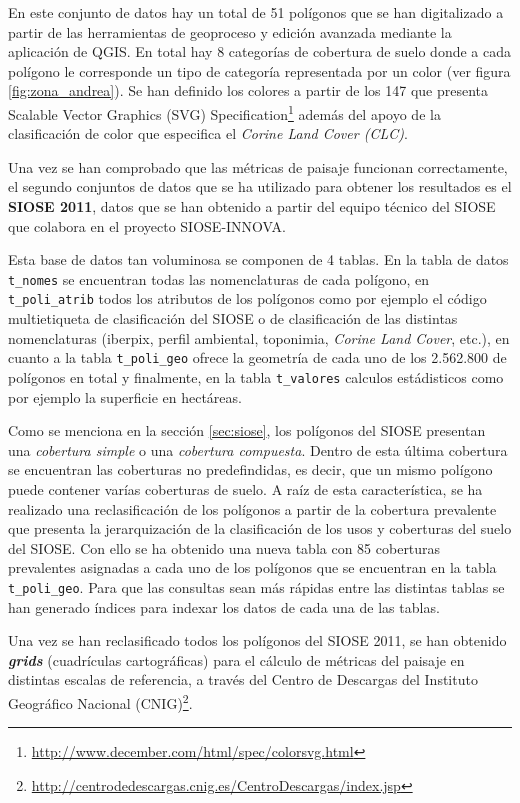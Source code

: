 En este conjunto de datos hay un total de 51 polígonos que se han digitalizado a partir de las herramientas de geoproceso y edición avanzada mediante la aplicación de QGIS. En total hay 8 categorías de cobertura de suelo donde a cada polígono le corresponde un tipo de categoría representada por un color (ver figura \ref{fig:zona_andrea}). Se han definido los colores a partir de los 147 que presenta Scalable Vector Graphics (SVG) Specification\footnote{\url{http://www.december.com/html/spec/colorsvg.html}} además del apoyo de la clasificación de color que especifica el \textit{Corine Land Cover (CLC)}.

Una vez se han comprobado que las métricas de paisaje funcionan correctamente, el segundo conjuntos de datos que se ha utilizado para obtener los resultados es el \textbf{SIOSE 2011}, datos que se han obtenido a partir del equipo técnico del SIOSE que colabora en el proyecto SIOSE-INNOVA. 

Esta base de datos tan voluminosa se componen de 4 tablas. En la tabla de datos \texttt{t\_nomes} se encuentran todas las nomenclaturas de cada polígono, en \texttt{t\_poli\_atrib} todos los atributos de los polígonos como por ejemplo el código multietiqueta de clasificación del SIOSE o de clasificación de las distintas nomenclaturas (iberpix, perfil ambiental, toponimia, \textit{Corine Land Cover}, etc.), en cuanto a la tabla \texttt{t\_poli\_geo} ofrece la geometría de cada uno de los 2.562.800 de polígonos en total y finalmente, en la tabla \texttt{t\_valores} calculos estádisticos como por ejemplo la superficie en hectáreas.

Como se menciona en la sección \ref{sec:siose}, los polígonos del SIOSE presentan una \textit{cobertura simple} o una \textit{cobertura compuesta}. Dentro de esta última cobertura se encuentran las coberturas no predefindidas, es decir, que un mismo polígono puede contener varías coberturas de suelo. A raíz de esta característica, se ha realizado una reclasificación de los polígonos a partir de la cobertura prevalente que presenta la jerarquización de la clasificación de los usos y coberturas del suelo del SIOSE. Con ello se ha obtenido una nueva tabla con 85 coberturas prevalentes asignadas a cada uno de los polígonos que se encuentran en la tabla \texttt{t\_poli\_geo}. Para que las consultas sean más rápidas entre las distintas tablas se han generado índices para indexar los datos de cada una de las tablas. 

Una vez se han reclasificado todos los polígonos del SIOSE 2011, se han obtenido \textbf{\textit{grids}} (cuadrículas cartográficas) para el cálculo de métricas del paisaje en distintas escalas de referencia, a través del Centro de Descargas del Instituto Geográfico Nacional (CNIG)\footnote{\url{http://centrodedescargas.cnig.es/CentroDescargas/index.jsp}}. 

